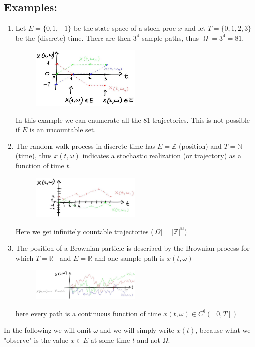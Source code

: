 \subsection*{Examples:}
\begin{enumerate}
  \item Let $E=\{0,1,-1\}$ be the state space of a stoch-proc $x$ and let
    $T=\{0,1,2,3\}$ be the (discrete) time. There are then $3^{4}$ sample paths,
    thus $| 
    \Omega|=3^{4}=81$.
    \begin{figure}[H]
      \centering
      \includegraphics[width=0.5\textwidth]{graphics/2025_10_17_79731b7d4e7690819b81g-03}
    \end{figure}
    In this example we can enumerate all the 81 trajectories. This is not
    possible if $E$ is an uncountable set.
  \item The random walk process in discrete time has $E=\mathbb{Z}$ (position)
    and $T=\mathbb{N}$ (time), thus $x(t, \omega)$ indicates a stochastic
    realization (or trajectory) as a function of time $t$.
    \begin{figure}[H]
      \centering
      \includegraphics[width=0.5\textwidth]{graphics/2025_10_17_79731b7d4e7690819b81g-03(1)}
    \end{figure}
    Here we get infinitely countable trajectories ($| 
    \Omega|=|\mathbb{Z}|^{\mathbb{N}}$)
  \item The position of a Brownian particle is described by the Brownian process
    for which $T=\mathbb{R}^{+}$ and $E=\mathbb{R}$ and one sample path is
    $x(t, \omega)$
    \begin{figure}[H]
      \centering
      \includegraphics[width=0.5\textwidth]{graphics/2025_10_17_79731b7d4e7690819b81g-03(2)}
    \end{figure}
    here every path is a continuous function of time
    $x(t, \omega) \in C^{0}([0, T])$
\end{enumerate}
In the following we will omit $\omega$ and we will simply write $x(t)$, because
what we "observe" is the value $x \in E$ at some time $t$ and not $ 
\Omega$.

